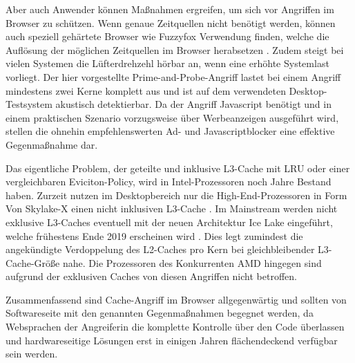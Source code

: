 Aber auch Anwender können Maßnahmen ergreifen, um sich vor Angriffen im Browser zu schützen.
Wenn genaue Zeitquellen nicht benötigt werden, können auch speziell gehärtete Browser wie Fuzzyfox \cite{Fuzzyfox} Verwendung finden, welche die Auflösung der möglichen Zeitquellen im Browser herabsetzen \cite{FantasticTimers}.
Zudem steigt bei vielen Systemen die Lüfterdrehzehl hörbar an, wenn eine erhöhte Systemlast vorliegt. 
Der hier vorgestellte Prime-and-Probe-Angriff lastet bei einem Angriff mindestens zwei Kerne komplett aus und ist auf dem verwendeten Desktop-Testsystem akustisch detektierbar.
Da der Angriff Javascript benötigt und in einem praktischen Szenario vorzugsweise über Werbeanzeigen ausgeführt wird, stellen die ohnehin empfehlenswerten Ad- und Javascriptblocker eine effektive Gegenmaßnahme dar.

Das eigentliche Problem, der geteilte und inklusive L3-Cache mit LRU oder einer vergleichbaren Eviciton-Policy, wird in Intel-Prozessoren noch Jahre Bestand haben.
Zurzeit nutzen im Desktopbereich nur die High-End-Prozessoren in Form Von Skylake-X einen nicht inklusiven L3-Cache \cite{SkylakeXL3Cache}.
Im Mainstream werden nicht exklusive L3-Caches eventuell mit der neuen Architektur Ice Lake eingeführt, welche frühestens Ende 2019 erscheinen wird \cite{IceLakeReleaseDate}.
Dies legt zumindest die angekündigte Verdoppelung des L2-Caches pro Kern bei gleichbleibender L3-Cache-Größe nahe.
Die Prozessoren des Konkurrenten AMD hingegen sind aufgrund der exklusiven Caches \cite{CacheRyzen} von diesen Angriffen nicht betroffen.

Zusammenfassend sind Cache-Angriff im Browser allgegenwärtig und sollten von Softwareseite mit den genannten Gegenmaßnahmen begegnet werden, da Websprachen der Angreiferin die komplette Kontrolle über den Code überlassen und hardwareseitige Lösungen erst in einigen Jahren flächendeckend verfügbar sein werden.





